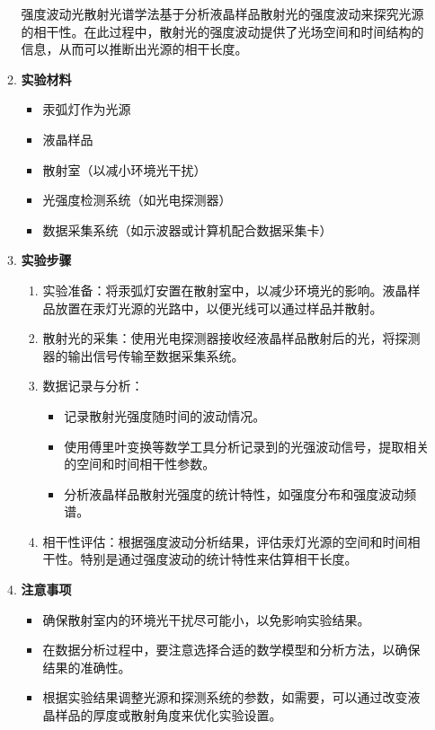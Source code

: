 \documentclass[dvipsnames, svgnames,a4paper,11pt]{article}
\begin{document}
\begin{enumerate}
\begin{enumerate}
			强度波动光散射光谱学法基于分析液晶样品散射光的强度波动来探究光源的相干性。在此过程中，散射光的强度波动提供了光场空间和时间结构的信息，从而可以推断出光源的相干长度。
			
			\item \textbf{实验材料}
			
			\begin{itemize}
				\item 汞弧灯作为光源
				\item 液晶样品
				\item 散射室（以减小环境光干扰）
				\item 光强度检测系统（如光电探测器）
				\item 数据采集系统（如示波器或计算机配合数据采集卡）
			\end{itemize}
			
			\item \textbf{实验步骤}
			
			\begin{enumerate}
				\item 实验准备：将汞弧灯安置在散射室中，以减少环境光的影响。液晶样品放置在汞灯光源的光路中，以便光线可以通过样品并散射。
				\item 散射光的采集：使用光电探测器接收经液晶样品散射后的光，将探测器的输出信号传输至数据采集系统。
				\item 数据记录与分析：
				\begin{itemize}
					\item 记录散射光强度随时间的波动情况。
					\item 使用傅里叶变换等数学工具分析记录到的光强波动信号，提取相关的空间和时间相干性参数。
					\item 分析液晶样品散射光强度的统计特性，如强度分布和强度波动频谱。
				\end{itemize}
				\item 相干性评估：根据强度波动分析结果，评估汞灯光源的空间和时间相干性。特别是通过强度波动的统计特性来估算相干长度。
			\end{enumerate}
			
			\item \textbf{注意事项}
			
			\begin{itemize}
				\item 确保散射室内的环境光干扰尽可能小，以免影响实验结果。
				\item 在数据分析过程中，要注意选择合适的数学模型和分析方法，以确保结果的准确性。
				\item 根据实验结果调整光源和探测系统的参数，如需要，可以通过改变液晶样品的厚度或散射角度来优化实验设置。
			\end{itemize}
			

\end{enumerate}
\end{enumerate}
\end{document}
